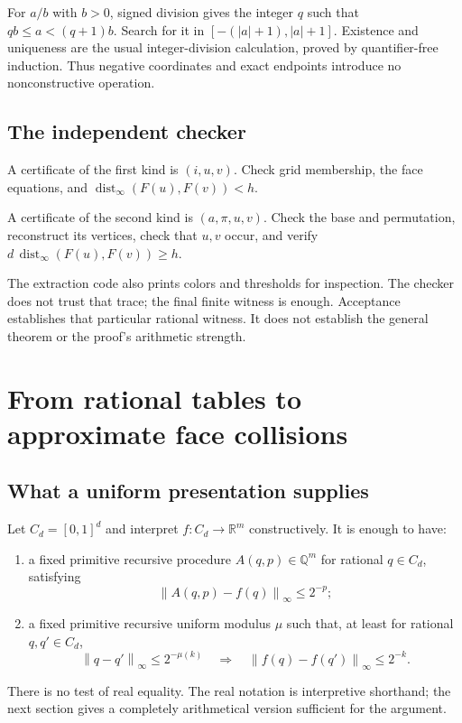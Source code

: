 \documentclass[11pt,a4paper]{article}
\theoremstyle{definition}
\newcommand{\Q}{\mathbb Q}\newcommand{\R}{\mathbb R}
\newcommand{\dist}{\operatorname{dist}_{\infty}}
\newcommand{\norm}[1]{\left\lVert #1\right\rVert_{\infty}}
\begin{document}
For $a/b$ with $b>0$, signed division gives the integer $q$
such that $qb\leq a<(q+1)b$. Search for it in
$[-(|a|+1),|a|+1]$. Existence and uniqueness are the usual
integer-division calculation, proved by quantifier-free
induction. Thus negative coordinates and exact endpoints
introduce no nonconstructive operation.

\subsection{The independent checker}
A certificate of the first kind is $(i,u,v)$. Check grid
membership, the face equations, and
$\dist(F(u),F(v))<h$.

A certificate of the second kind is $(a,\pi,u,v)$. Check the
base and permutation, reconstruct its vertices, check that
$u,v$ occur, and verify $d\,\dist(F(u),F(v))\geq h$.

The extraction code also prints colors and thresholds for
inspection. The checker does not trust that trace; the final
finite witness is enough. Acceptance establishes that
particular rational witness. It does not establish the
general theorem or the proof's arithmetic strength.

\section{From rational tables to approximate face collisions}
\subsection{What a uniform presentation supplies}
Let $C_d=[0,1]^d$ and interpret $f:C_d\to\R^m$
constructively. It is enough to have:
\begin{enumerate}
\item a fixed primitive recursive procedure $A(q,p)\in\Q^m$
for rational $q\in C_d$, satisfying
\begin{equation}\label{eq:eval}
                 \norm{A(q,p)-f(q)}\leq2^{-p};
\end{equation}
\item a fixed primitive recursive uniform modulus $\mu$ such
that, at least for rational $q,q'\in C_d$,
\begin{equation}\label{eq:modulus}
 \norm{q-q'}\leq2^{-\mu(k)}
       \quad\Longrightarrow\quad
 \norm{f(q)-f(q')}\leq2^{-k}.
\end{equation}
\end{enumerate}
There is no test of real equality. The real notation is
interpretive shorthand; the next section gives a completely
arithmetical version sufficient for the argument.
\end{document}
